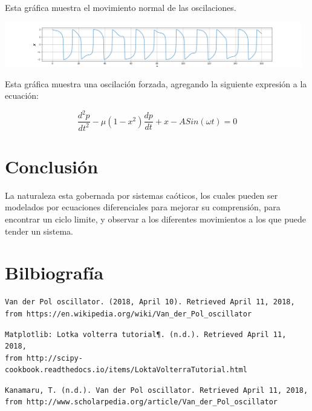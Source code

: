 \documentclass{article}
\begin{document}
Esta gráfica muestra el movimiento normal de las oscilaciones.

\begin{center}
	\includegraphics[width=13cm]{CuartaFig.png}
    
\end{center}
\vspace{0.3cm}

Esta gráfica muestra una oscilación forzada, agregando la siguiente expresión a la ecuación:

 \begin{equation}
 \frac{d^2p}{dt^2} -\mu (1-x^2)\frac{dp}{dt} + x -ASin(\omega t) = 0
 \end{equation}
 
 
\section{Conclusión}

La naturaleza esta gobernada por sistemas caóticos, los cuales pueden ser modelados por ecuaciones diferenciales para mejorar su comprensión, para encontrar un ciclo limite, y observar a los diferentes movimientos a los que puede tender un sistema.


\section{Bilbiografía}

\begin{verbatim}
Van der Pol oscillator. (2018, April 10). Retrieved April 11, 2018,
from https://en.wikipedia.org/wiki/Van_der_Pol_oscillator 
\end{verbatim}

\begin{verbatim}
Matplotlib: Lotka volterra tutorial¶. (n.d.). Retrieved April 11, 2018, 
from http://scipy-cookbook.readthedocs.io/items/LoktaVolterraTutorial.html 
\end{verbatim}

\begin{verbatim}
Kanamaru, T. (n.d.). Van der Pol oscillator. Retrieved April 11, 2018, 
from http://www.scholarpedia.org/article/Van_der_Pol_oscillator 
\end{verbatim}
\end{document}
